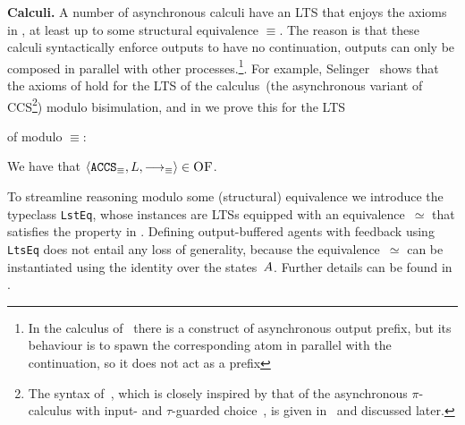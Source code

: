 {\bfseries Calculi.}
A number of asynchronous calculi
\cite{DBLP:conf/ecoop/HondaT91,boudol:inria-00076939,DBLP:conf/fsttcs/CastellaniH98,DBLP:journals/toplas/HennessyR02,palamidessi_2003,DBLP:conf/birthday/Sangiorgi19}
have an LTS that enjoys the axioms in , at least up to
some structural equivalence $\equiv$. The reason is that these calculi
syntactically enforce outputs to have no continuation, \ie outputs can
only be composed in parallel with other
processes.\footnote{In the calculus \TACCS
    of~\cite{DBLP:conf/fsttcs/CastellaniH98} there is a construct of
    asynchronous output prefix, but its behaviour is to spawn the
    corresponding atom in parallel with the continuation, so it
      does not act as a prefix}.  For
example, Selinger~\cite{DBLP:conf/concur/Selinger97} shows that the
  axioms of  hold for the LTS of the calculus~\ACCS (the
asynchronous variant of CCS\footnote{The syntax of~\ACCS, which
    is closely inspired by that of the asynchronous $\pi$-calculus
    with input- and $\tau$-guarded choice~\cite{ACS96,ACS98}, is given
    in~ and discussed later.})  modulo
bisimulation, and in
 we prove this
for the LTS {of \ACCS modulo $\equiv$:%
\begin{lemma}
  \label{lem:ACCS-obaFB}
  We have that $\langle {\texttt{ACCS}}_{\equiv}, L, {\mathrel{\overset{}\longrightarrow}}_{\equiv} \rangle \in \textsc{OF}$.
\end{lemma}
}
To streamline
reasoning modulo some (structural) equivalence we introduce the
typeclass \lstinline|LstEq|, %
whose
instances are LTSs
equipped with an equivalence~$\simeq$
that satisfies the property in .
Defining output-buffered agents with feedback using \lstinline!LtsEq!
does not entail any loss of generality, because the equivalence~$\simeq$
can be instantiated using the identity over the states~$A$.
Further details can be found in .




